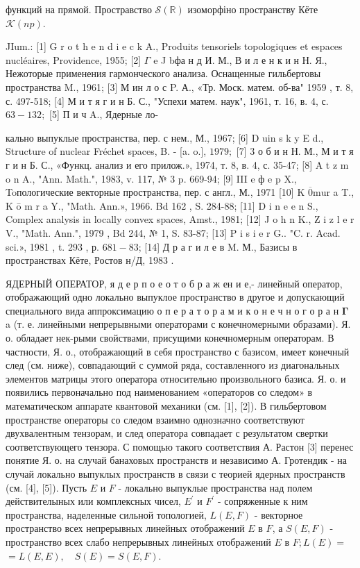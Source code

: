 \documentclass[10pt]{article}
\begin{document}
функций на прямой. Простравство $\mathscr{S}(\mathbb{R})$ изоморфіно пространству Кёте $\mathscr{K}(n p)$.



JIum.: [1] G r o t h e n d i e c k A., Produits tensoriels topologiques et espaces nucléaires, Providence, 1955; [2] $\Gamma$ e J bфа н д И. М., В и л е н к и н Н. Я., Нежоторые применения гармонческого анализа. Оснащенные гильбертовы пространства M., 1961; [3] М ин л о с P. А., «Тр. Моск. матем. об-ва" 1959 , т. 8, с. 497-518; [4] М и т я г и н Б. С., "Успехи матем. наук", 1961, т. 16, в. 4, с. $63-132 ;$ [5] П и ч A., Ядерные ло-

кально выпуклые пространства, пер. с нем., М., 1967; [6] D uin s k y E d., Structure of nuclear Fréchet spaces, B. - [a. o.], $1979 ;$ [7] 3 о б и н Н. М., М и т я г и н Б. С., «Функц. анализ и его прилож.», 1974, т. 8, в. 4, с. 35-47; [8] A t z m o n A., "Ann. Math.", 1983, v. 117, № 3 p. 669-94; [9] III e ф e p X., Toпологические векторные пространства, пер. с англ., М., 1971 [10] K $\overline{0} \mathrm{mur}$ a T., K ō m r a Y., "Math. Ann.», 1966. Bd 162 , S. 284-88; [11] D i n e e n S., Complex analysis in locally convex spaces, Amst., 1981; [12] J o h n K., Z i z l e r V., "Math. Ann.", 1979 , Bd 244, № 1, S. 83-87; [13] P i s i e r G.. "C. r. Acad. sci.», 1981 , t. 293 , р. $681-83$; [14] Д р а г и л е в M. М., Базисы в пространствах Кёте, Ростов н/Д, 1983 .



ЯДЕРНЫЙ ОПЕРАТОР, я д е р п о е о т о б р а ж ен и е,- линейный оператор, отображающий одно локально выпуклое пространство в другое и допускающий специального вида аппроксимацию о п е р а т о р а м и к о н е ч н о г о р а н $\boldsymbol{\Gamma}$ a (т. е. линейными непрерывными операторами с конечномерными образами). Я. о. обладает нек-рыми свойствами, присущими конечномерным операторам. В частности, Я. о., отображающий в себя пространство с базисом, имеет конечный след (см. ниже), совпадающий с суммой ряда, составленного из диагональных элементов матрицы этого оператора относительно произвольного базиса. Я. о. и появились первоначально под наименованием «операторов со следом» в математическом аппарате квантовой механики (см. [1], [2]). В гильбертовом пространстве операторы со следом взаимно однозначно соответствуют двухвалентным тензорам, и след оператора совпадает с результатом свертки соответствующего тензора. С помощью такого соответствия А. Растон [3] перенес понятие Я. о. на случай банаховых пространств и независимо А. Гротендик - на случай локально выпуклых пространств в связи с теорией ядерных пространств (см. [4], [5]). Пусть $E$ и $F$ - локально выпуклые пространства над полем действителыных или комплексных чисел, $E^{\prime}$ и $F^{\prime}$ - сопряженные к ним пространства, наделенные сильной топологией, $L(E, F)$ - векторное пространство всех непрерывных линейных отображений $E$ в $F$, а $S(E, F)$ - пространство всех слабо непрерывных линейных отображений $E$ в $F ; L(E)=$ $=L(E, E), \quad S(E)=S(E, F)$.
\end{document}
